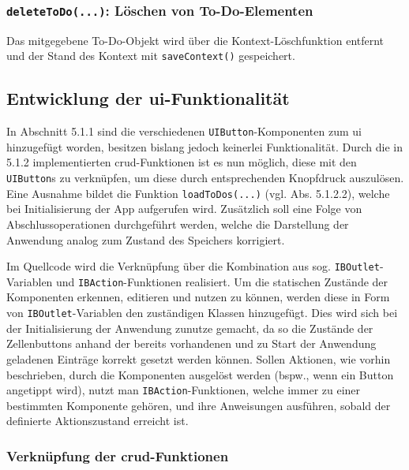 \subsubsection{\texttt{deleteToDo(...)}: Löschen von To-Do-Elementen}
Das mitgegebene To-Do-Objekt wird über die Kontext-Löschfunktion entfernt und der Stand des Kontext mit \texttt{saveContext()} gespeichert.

\subsection{Entwicklung der \ac{ui}-Funktionalität}
In Abschnitt 5.1.1 sind die verschiedenen \texttt{UIButton}-Komponenten zum \ac{ui} hinzugefügt worden, besitzen bislang jedoch keinerlei Funktionalität. Durch die in 5.1.2 implementierten \ac{crud}-Funktionen ist es nun möglich, diese mit den \texttt{UIButton}s zu verknüpfen, um diese durch entsprechenden Knopfdruck auszulösen. Eine Ausnahme bildet die Funktion \texttt{loadToDos(...)} (vgl. Abs. 5.1.2.2), welche bei Initialisierung der App aufgerufen wird. Zusätzlich soll eine Folge von Abschlussoperationen durchgeführt werden, welche die Darstellung der Anwendung analog zum Zustand des Speichers korrigiert.

Im Quellcode wird die Verknüpfung über die Kombination aus sog. \texttt{IBOutlet}-Variablen und \texttt{IBAction}-Funktionen realisiert. Um die statischen Zustände der Komponenten erkennen, editieren und nutzen zu können, werden diese in Form von \texttt{IBOutlet}-Variablen den zuständigen Klassen hinzugefügt. Dies wird sich bei der Initialisierung der Anwendung zunutze gemacht, da so die Zustände der Zellenbuttons anhand der bereits vorhandenen und zu Start der Anwendung geladenen Einträge korrekt gesetzt werden können. Sollen Aktionen, wie vorhin beschrieben, durch die Komponenten ausgelöst werden (bspw., wenn ein Button angetippt wird), nutzt man \texttt{IBAction}-Funktionen, welche immer zu einer bestimmten Komponente gehören, und ihre Anweisungen ausführen, sobald der definierte Aktionszustand erreicht ist.

\subsubsection{Verknüpfung der \ac{crud}-Funktionen}

